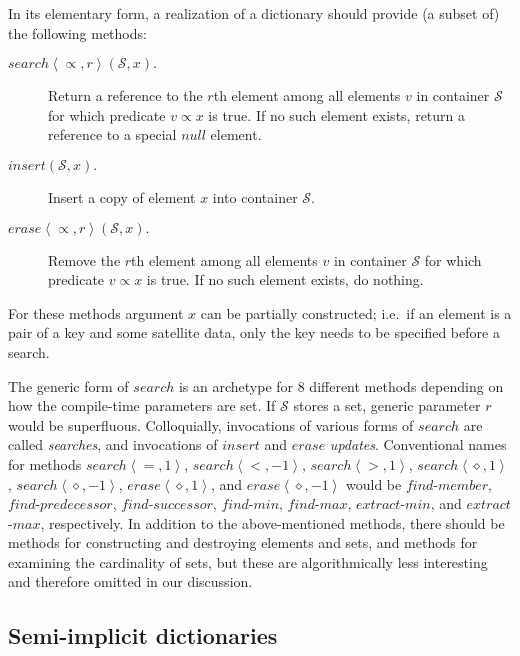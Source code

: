 \documentclass{DIKU-article}
\newcommand{\sequence}[1]{\left\langle#1\right\rangle}
\newcommand{\Findmin}{\mbox{$\mathit{find}$}\textnormal{-}\allowbreak{}\mbox{$\mathit{min}$}}
\newcommand{\Findmax}{\mbox{$\mathit{find}$}\textnormal{-}\allowbreak{}\mbox{$\mathit{max}$}}
\newcommand{\Member}{\mbox{$\mathit{find}$}\textnormal{-}\allowbreak{}\mbox{$\mathit{member}$}}
\newcommand{\Predecessor}{\mbox{$\mathit{find}$}\textnormal{-}\allowbreak{}\mbox{$\mathit{predecessor}$}}
\newcommand{\Successor}{\mbox{$\mathit{find}$}\textnormal{-}\allowbreak{}\mbox{$\mathit{successor}$}}
\newcommand{\Insert}{\mbox{$\mathit{insert}$}}
\newcommand{\Erase}{\mbox{$\mathit{erase}$}}
\newcommand{\Extractmin}{\mbox{$\mathit{extract}$}\textnormal{-}\allowbreak{}\mbox{$\mathit{min}$}}
\newcommand{\Extractmax}{\mbox{$\mathit{extract}$}\textnormal{-}\allowbreak{}\mbox{$\mathit{max}$}}
\newcommand{\Search}{\mbox{$\mathit{search}$}}
\newcommand{\Null}{\mbox{$\mathit{null}$}}
\begin{document}
In its elementary form, a realization of a dictionary should
provide (a subset of) the following methods:
\begin{description}

\item[$\Search\sequence{\propto,\mathit{r}}(\mathcal{S}, x).$] Return
a reference to the $r$th element among all elements $v$ in container
$\mathcal{S}$ for which predicate $v \propto x$ is true.  If no such
element exists, return a reference to a special \Null{} element.

\item[$\Insert{}(\mathcal{S}, x).$] Insert a copy of element $x$ into container $\mathcal{S}$.

\item[$\Erase\sequence{\propto,\mathit{r}}(\mathcal{S}, x).$] Remove
the $r$th element among all elements $v$ in container $\mathcal{S}$
for which predicate $v \propto x$ is true.  If no such element exists,
do nothing.
\end{description}
For these methods argument $x$ can be
partially constructed; i.e.~if an element is a pair of a key and some
satellite data, only the key needs to be specified before a search.

The generic form of \Search{} is an archetype for 8 different methods
depending on how the compile-time parameters are set. If $\mathcal{S}$
stores a set, generic parameter $r$ would be superfluous.
Colloquially, invocations of various forms of \Search{} are called
\emph{searches}, and invocations of \Insert{} and
\Erase{} \emph{updates}. 
Conventional
names for methods
$\Search\sequence{=,1}$,
$\Search\sequence{<,-1}$,
$\Search\sequence{>,1}$,
$\Search\sequence{\diamond,1}$, 
$\Search\sequence{\diamond,-1}$,
$\Erase\sequence{\diamond,1}$, and
$\Erase\sequence{\diamond,-1}$
would be
\Member{},
\Predecessor{}, 
\Successor{}, 
\Findmin{}, 
\Findmax{},
\Extractmin{}, and
\Extractmax{},
respectively.
In addition to the above-mentioned methods, there should be methods
for constructing and destroying elements and sets, and methods for
examining the cardinality of sets, but these are algorithmically less
interesting and therefore omitted in our discussion.

\subsection{Semi-implicit dictionaries}
\end{document}
